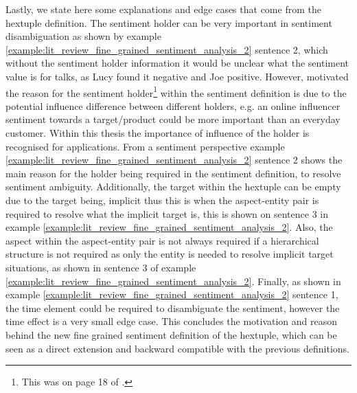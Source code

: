 Lastly, we state here some explanations and edge cases that come from the hextuple definition. The sentiment holder can be very important in sentiment disambiguation as shown by example \ref{example:lit_review_fine_grained_sentiment_analysis_2} sentence 2, which without the sentiment holder information it would be unclear what the sentiment value is for talks, as Lucy found it negative and Joe positive. However, \citet{liu2015sentiment} motivated the reason for the sentiment holder\footnote{This was on page 18 of \citet{liu2015sentiment}.} within the sentiment definition is due to the potential influence difference between different holders, e.g. an online influencer sentiment towards a target/product could be more important than an everyday customer. Within this thesis the importance of influence of the holder is recognised for applications. From a sentiment perspective example \ref{example:lit_review_fine_grained_sentiment_analysis_2} sentence 2 shows the main reason for the holder being required in the sentiment definition, to resolve sentiment ambiguity. Additionally, the target within the hextuple can be empty due to the target being, implicit thus this is when the aspect-entity pair is required to resolve what the implicit target is, this is shown on sentence 3 in example \ref{example:lit_review_fine_grained_sentiment_analysis_2}. Also, the aspect within the aspect-entity pair is not always required if a hierarchical structure is not required as only the entity is needed to resolve implicit target situations, as shown in sentence 3 of example \ref{example:lit_review_fine_grained_sentiment_analysis_2}. Finally, as shown in example \ref{example:lit_review_fine_grained_sentiment_analysis_2} sentence 1, the time element could be required to disambiguate the sentiment, however the time effect is a very small edge case. This concludes the motivation and reason behind the new fine grained sentiment definition of the hextuple, which can be seen as a direct extension and backward compatible with the previous definitions.

